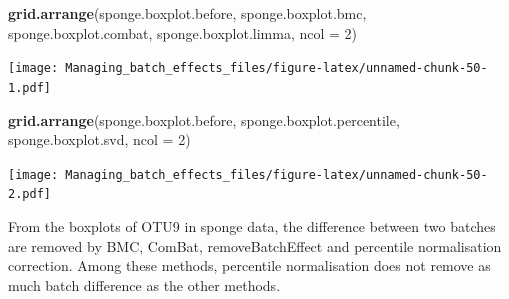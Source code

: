 \documentclass[]{book}
\newenvironment{Shaded}{\begin{snugshade}}{\end{snugshade}}
\newcommand{\KeywordTok}[1]{\textcolor[rgb]{0.13,0.29,0.53}{\textbf{#1}}}
\newcommand{\DataTypeTok}[1]{\textcolor[rgb]{0.13,0.29,0.53}{#1}}
\newcommand{\DecValTok}[1]{\textcolor[rgb]{0.00,0.00,0.81}{#1}}
\newcommand{\NormalTok}[1]{#1}
\begin{document}
\begin{Shaded}
\begin{Highlighting}[]
\KeywordTok{grid.arrange}\NormalTok{(sponge.boxplot.before, sponge.boxplot.bmc, }
\NormalTok{             sponge.boxplot.combat, sponge.boxplot.limma, }\DataTypeTok{ncol =} \DecValTok{2}\NormalTok{)}
\end{Highlighting}
\end{Shaded}

\texttt{[image: Managing\_batch\_effects\_files/figure-latex/unnamed-chunk-50-1.pdf]}

\begin{Shaded}
\begin{Highlighting}[]
\KeywordTok{grid.arrange}\NormalTok{(sponge.boxplot.before, sponge.boxplot.percentile, }
\NormalTok{             sponge.boxplot.svd, }\DataTypeTok{ncol =} \DecValTok{2}\NormalTok{)}
\end{Highlighting}
\end{Shaded}

\texttt{[image: Managing\_batch\_effects\_files/figure-latex/unnamed-chunk-50-2.pdf]}

From the boxplots of OTU9 in sponge data, the difference between two
batches are removed by BMC, ComBat, removeBatchEffect and percentile
normalisation correction. Among these methods, percentile normalisation
does not remove as much batch difference as the other methods.
\end{document}
